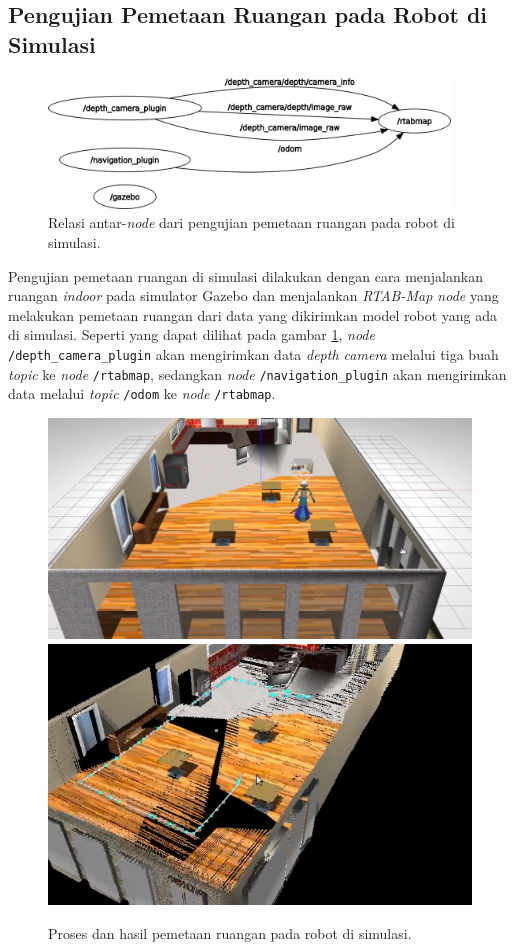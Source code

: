 \subsection{Pengujian Pemetaan Ruangan pada Robot di Simulasi}
\label{subsec:slamsimulasi}

\begin{figure}[ht]
  \centering
  \includegraphics[width=0.95\textwidth,keepaspectratio]{gambar/rosgraph-slam-simulation.png}
  \caption{Relasi antar-\emph{node} dari pengujian pemetaan ruangan pada robot di simulasi.}
  \label{fig:rosgraphslamsimulation}
\end{figure}

Pengujian pemetaan ruangan di simulasi dilakukan dengan cara menjalankan ruangan \emph{indoor} pada simulator Gazebo dan menjalankan \emph{RTAB-Map node} yang melakukan pemetaan ruangan dari data yang dikirimkan model robot yang ada di simulasi.
Seperti yang dapat dilihat pada gambar \ref{fig:rosgraphslamsimulation},
  \emph{node} \lstinline{/depth_camera_plugin} akan mengirimkan data \emph{depth camera} melalui tiga buah \emph{topic} ke \emph{node} \lstinline{/rtabmap},
  sedangkan \emph{node} \lstinline{/navigation_plugin} akan mengirimkan data melalui \emph{topic} \lstinline{/odom} ke \emph{node} \lstinline{/rtabmap}.

\begin{figure}[ht]
  \centering
  \includegraphics[height=0.26\textwidth,keepaspectratio]{gambar/proses-pemetaan.png}
  \includegraphics[height=0.26\textwidth,keepaspectratio]{gambar/hasil-pemetaan.png}
  \caption{Proses dan hasil pemetaan ruangan pada robot di simulasi.}
  \label{fig:hasilpemetaan}
\end{figure}

